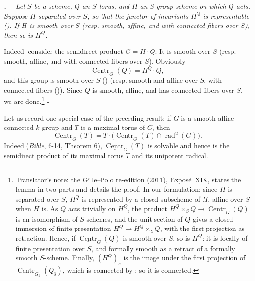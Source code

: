 

\par\medskip\noindent
{}\textbf{\textit{.}}---
\textit{Let \(S\) be a scheme, \(Q\) an \(S\)-torus, and \(H\) an \(S\)-group
scheme on which \(Q\) acts.  Suppose \(H\) separated over \(S\), so that the
functor of invariants \(H^{Q}\) is representable
\textup{()}.  If \(H\) is smooth over \(S\)
\textup{(resp. smooth, affine, and with connected fibers over \(S\))}, then
so is \(H^{Q}\).}

Indeed, consider the semidirect product \(G=H\cdot Q\).  It is smooth over
\(S\) \textup{(resp. smooth, affine, and with connected fibers over \(S\))}.
Obviously
\[
  \underline{\operatorname{Centr}}_{G}(Q)=H^{Q}\cdot Q,
\]
and this group is smooth over \(S\) () \textup{(resp. smooth
and affine over \(S\), with connected fibers
())}.  Since \(Q\) is smooth, affine, and has connected
fibers over \(S\), we are done.\footnote{Translator's note: the Gille--Polo re-edition (2011), Exposé~XIX, states the
lemma in two parts and details the proof. In our formulation: since \(H\) is
separated over \(S\), \(H^{Q}\) is represented by a closed subscheme of \(H\),
affine over \(S\) when \(H\) is. As \(Q\) acts trivially on \(H^{Q}\), the
product \(H^{Q}\times_SQ\to\underline{\operatorname{Centr}}_G(Q)\) is an
isomorphism of \(S\)-schemes, and the unit section of \(Q\) gives a closed
immersion of finite presentation \(H^{Q}\to H^{Q}\times_SQ\), with the first
projection as retraction. Hence, if \(\underline{\operatorname{Centr}}_G(Q)\)
is smooth over \(S\), so is \(H^{Q}\): it is locally of finite presentation
over \(S\), and formally smooth as a retract of a formally smooth
\(S\)-scheme. Finally, \((H^{Q})_{\bar s}\) is the image under the first
projection of \(\underline{\operatorname{Centr}}_{G_{\bar s}}(Q_{\bar s})\),
which is connected by ; so it is connected.}
\hfill\(\square\)

Let us record one special case of the preceding result: if \(G\) is a smooth
affine connected \(k\)-group and \(T\) is a maximal torus of \(G\), then
\[
  \underline{\operatorname{Centr}}_{G}(T)
  =
  T\cdot\bigl(
    \underline{\operatorname{Centr}}_{G}(T)\cap
    \operatorname{rad}^{u}(G)\bigr).
\]
Indeed (\emph{Bible}, 6-14, Theorem 6),
\(\underline{\operatorname{Centr}}_{G}(T)\) is solvable and hence is the
semidirect product of its maximal torus \(T\) and its unipotent radical.

